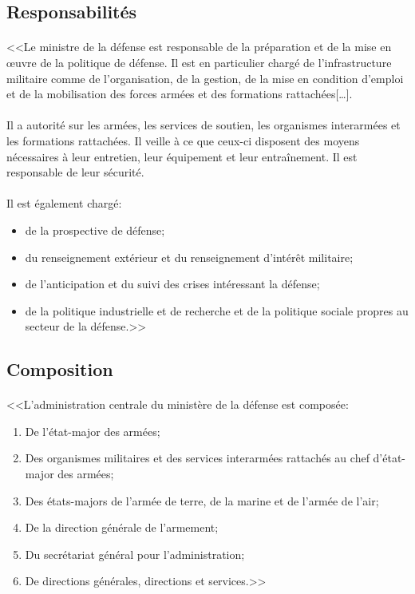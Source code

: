 \documentclass[11pt, book, english, french, standardlists]{upmethodology-document}
\begin{document}
			\subsection{Responsabilités}
				\paragraph*{}
					<<Le ministre de la défense est responsable de la préparation et de la mise en œuvre de la politique de défense. Il est en particulier chargé de l'infrastructure militaire comme de l'organisation, de la gestion, de la mise en condition d'emploi et de la mobilisation des forces armées et des formations rattachées[\ldots].
				\paragraph*{}
					Il a autorité sur les armées, les services de soutien, les organismes interarmées et les formations rattachées. Il veille à ce que ceux-ci disposent des moyens nécessaires à leur entretien, leur équipement et leur entraînement. Il est responsable de leur sécurité.
				\paragraph*{}
					Il est également chargé:
					\begin{itemize}
						\item de la prospective de défense;
						\item du renseignement extérieur et du renseignement d'intérêt militaire;
						\item de l'anticipation et du suivi des crises intéressant la défense;
						\item de la politique industrielle et de recherche et de la politique sociale propres au secteur de la défense.>>\cite{CodeDefenseL1142-1}
					\end{itemize}
			\subsection{Composition}
				\paragraph*{}
					<<L'administration centrale du ministère de la défense est composée:
					\begin{enumerate}
						\item De l'état-major des armées;
						\item Des organismes militaires et des services interarmées rattachés au chef d'état-major des armées;
						\item Des états-majors de l'armée de terre, de la marine et de l'armée de l'air;
						\item De la direction générale de l'armement;
						\item Du secrétariat général pour l'administration;
						\item De directions générales, directions et services.>>\cite{DEFD0918712D}
					\end{enumerate}
\end{document}

